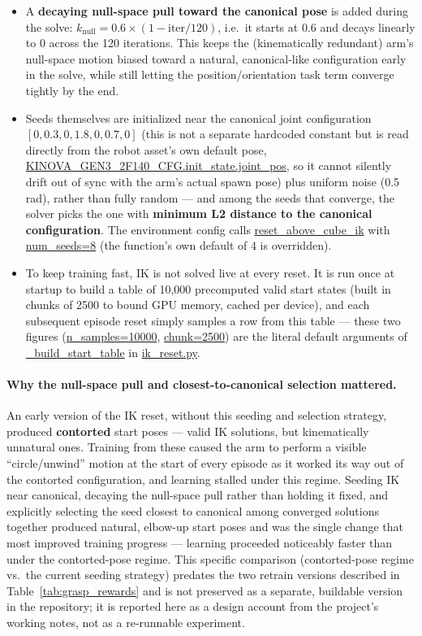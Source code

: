 \documentclass[11pt]{article}
\begin{document}
\begin{itemize}
    \item A \textbf{decaying null-space pull toward the canonical pose} is added
    during the solve: $k_{\text{null}} = 0.6 \times (1 - \text{iter}/120)$, i.e.\ it
    starts at 0.6 and decays linearly to 0 across the 120 iterations. This keeps
    the (kinematically redundant) arm's null-space motion biased toward a natural,
    canonical-like configuration early in the solve, while still letting the
    position/orientation task term converge tightly by the end.
    \item Seeds themselves are initialized near the canonical joint configuration
    $[0, 0.3, 0, 1.8, 0, 0.7, 0]$ (this is not a separate hardcoded constant but is
    read directly from the robot asset's own default pose,
    \url{KINOVA_GEN3_2F140_CFG.init_state.joint_pos}, so it cannot silently
    drift out of sync with the arm's actual spawn pose) plus uniform noise
    (0.5\,rad), rather than fully random --- and among the seeds that converge, the
    solver picks the one with \textbf{minimum L2 distance to the canonical
    configuration}. The environment config calls \url{reset_above_cube_ik}
    with \url{num_seeds=8} (the function's own default of 4 is overridden).
    \item To keep training fast, IK is not solved live at every reset. It is run
    once at startup to build a table of 10{,}000 precomputed valid start
    states (built in chunks of 2500 to bound GPU memory, cached per device), and
    each subsequent episode reset simply samples a row from this table --- these
    two figures (\url{n_samples=10000}, \url{chunk=2500}) are the literal
    default arguments of \url{_build_start_table} in \url{ik_reset.py}.
\end{itemize}

\paragraph{Why the null-space pull and closest-to-canonical selection mattered.}
An early version of the IK reset, without this seeding and selection strategy,
produced \textbf{contorted} start poses --- valid IK solutions, but kinematically
unnatural ones. Training from these caused the arm to perform a visible
``circle/unwind'' motion at the start of every episode as it worked its way out of
the contorted configuration, and learning stalled under this regime. Seeding IK
near canonical, decaying the null-space pull rather than holding it fixed, and
explicitly selecting the seed closest to canonical among converged solutions
together produced natural, elbow-up start poses and was the single change that
most improved training progress --- learning proceeded noticeably faster than
under the contorted-pose regime. This specific comparison (contorted-pose regime
vs.\ the current seeding strategy) predates the two retrain versions described in
Table~\ref{tab:grasp_rewards} and is not preserved as a separate, buildable
version in the repository; it is reported here as a design account from the
project's working notes, not as a re-runnable experiment.
\end{document}
